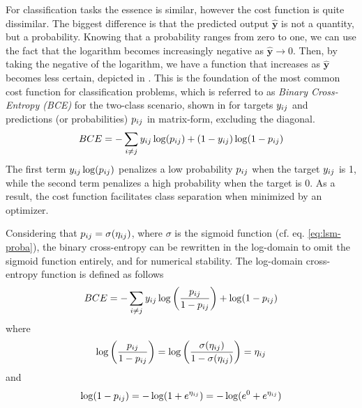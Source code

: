         For classification tasks the essence is similar, however the cost function is quite dissimilar. The biggest difference is that the predicted output $\bm{\hat{y}}$ is not a quantity, but a probability. Knowing that a probability ranges from zero to one, we can use the fact that the logarithm becomes increasingly negative as $\bm{\hat{y}}\rightarrow0$. Then, by taking the negative of the logarithm, we have a function that increases as $\bm{\hat{y}}$ becomes less certain, depicted in .
        This is the foundation of the most common cost function for classification problems, which is referred to as \emph{Binary Cross-Entropy (BCE)} for the two-class scenario, shown in  for targets $\sub(y)$ and predictions (or probabilities) $\sub(p)$ in matrix-form, excluding the diagonal.
        \begin{equation}\label{eq:mopt-bceloss}
            BCE = -\sum_{i\neq j} \sub(y)\log(\sub(p))+(1-\sub(y))\log(1-\sub(p))
        \end{equation}
        The first term $\sub(y)\log(\sub(p))$ penalizes a low probability $\sub(p)$ when the target $\sub(y)$ is 1, while the second term penalizes a high probability when the target is 0. As a result, the cost function facilitates class separation when minimized by an optimizer.
        
        Considering that $\sub(p)=\sigma(\sub(\eta))$, where $\sigma$ is the sigmoid function (cf. eq. \ref{eq:lsm-proba}), the binary cross-entropy can be rewritten in the log-domain to omit the sigmoid function entirely, and for numerical stability. The log-domain cross-entropy function is defined as follows
        \begin{equation}\label{eq:bce-log-domain}
            BCE = -\sum_{i\neq j} \sub(y)\log\left(\frac{\sub(p)}{1-\sub(p)}\right) + \log(1-\sub(p))
        \end{equation}
        where %
        \begin{equation}\label{eq:bce-rewrite-first}
            \log\left(\frac{\sub(p)}{1-\sub(p)}\right) =
            \log\left(\frac{\sigma(\sub(\eta))}{1-\sigma(\sub(\eta))}\right) = \sub(\eta)
        \end{equation}
        and %
        \begin{equation}\label{eq:bce-rewrite-second}
            \log(1-\sub(p))=-\log(1+e^{\sub(\eta)})=-\log(e^0+e^{\sub(\eta)})
        \end{equation}
        
